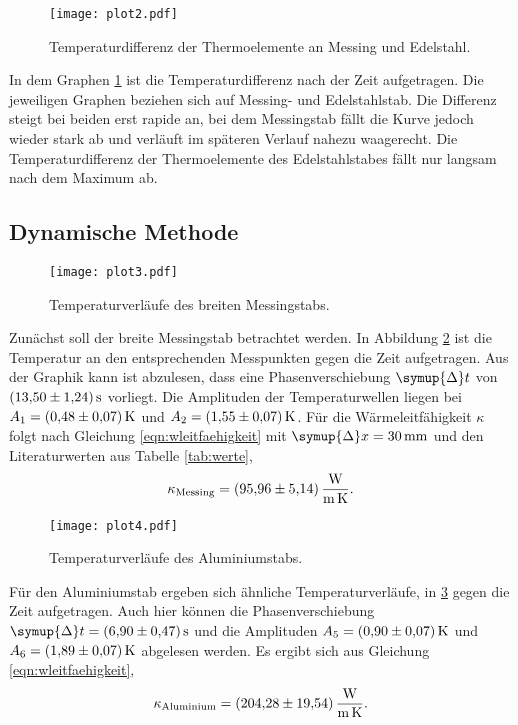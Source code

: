%
\begin{figure}[H]
    \centering
    \texttt{[image: plot2.pdf]}
    \caption{Temperaturdifferenz der Thermoelemente an Messing und Edelstahl.}
    \label{fig:plot2}
\end{figure}
%
In dem Graphen \ref{fig:plot2} ist die Temperaturdifferenz nach der Zeit aufgetragen.
Die jeweiligen Graphen beziehen sich auf Messing- und Edelstahlstab.
Die Differenz steigt bei beiden erst rapide an, bei dem Messingstab fällt die Kurve jedoch
wieder stark ab und verläuft im späteren Verlauf nahezu waagerecht.
Die Temperaturdifferenz der Thermoelemente des Edelstahlstabes fällt nur langsam nach dem Maximum ab.
%
\subsection{Dynamische Methode}
\begin{figure}
    \centering
    \texttt{[image: plot3.pdf]}
    \caption{Temperaturverläufe des breiten Messingstabs.}
    \label{fig:plot3}
\end{figure}
%
Zunächst soll der breite Messingstab betrachtet werden.
In Abbildung \ref{fig:plot3} ist die Temperatur an den entsprechenden Messpunkten gegen die Zeit aufgetragen.
Aus der Graphik kann ist abzulesen, dass eine Phasenverschiebung $\symup{\Delta} t$ von
$\SI{13.50\pm1.24}{\second}$ vorliegt. Die Amplituden der Temperaturwellen liegen
bei $A_1 = \SI{0.48\pm0.07}{\kelvin}$ und $A_2 = \SI{1.55\pm0.07}{\kelvin}$.
Für die Wärmeleitfähigkeit $\kappa$ folgt nach Gleichung \eqref{eqn:wleitfaehigkeit} mit
$\symup{\Delta}x = \SI{30}{\milli\meter}$ und den Literaturwerten aus Tabelle \ref{tab:werte},
\begin{equation*}
\kappa_\text{Messing} = \SI{95.96\pm 5.14}{\watt\per\meter\per\kelvin} .
\end{equation*}
%
\begin{figure}
    \centering
    \texttt{[image: plot4.pdf]}
    \caption{Temperaturverläufe des Aluminiumstabs.}
    \label{fig:plot4}
\end{figure}
%
Für den Aluminiumstab ergeben sich ähnliche Temperaturverläufe, in \ref{fig:plot4} gegen die Zeit aufgetragen.
Auch hier können die Phasenverschiebung $\symup{\Delta} t = \SI{6.90\pm0.47}{\second}$
und die Amplituden $A_5 = \SI{0.9\pm0.07}{\kelvin}$ und $A_6 = \SI{1.89\pm0.07}{\kelvin}$
abgelesen werden. Es ergibt sich aus Gleichung \eqref{eqn:wleitfaehigkeit},
\begin{equation*}
\kappa_\text{Aluminium} = \SI{204.28\pm 19.54}{\watt\per\meter\per\kelvin} .
\end{equation*}
